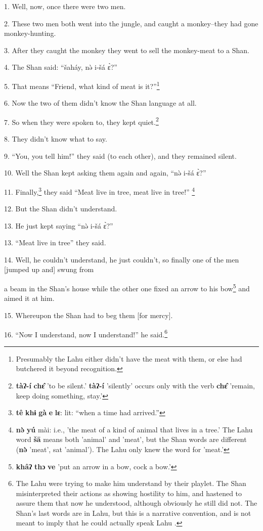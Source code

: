 \setcounter{footnote}{0}

1. Well, now, once there were two men.

2. These two men both went into the jungle, and caught a monkey--they had gone monkey-hunting.

3. After they caught the monkey they went to sell the monkey-meat to a Shan.

4. The Shan said: ``šaháy, nə̀ i-šá ɛ̀?''

5. That means ``Friend, what kind of meat is it?''\footnote{Presumably the Lahu either didn't have the meat with them, or else had butchered it beyond recognition.}

6. Now the two of them didn't know the Shan language at all.

7. So when they were spoken to, they kept quiet.\footnote{\textbf{tàʔ-í} \textbf{chɛ̂} 'to be silent.' \textbf{tàʔ-í} 'silently' occurs only with the verb \textbf{chɛ̂} 'remain, keep doing something, stay.'}

8. They didn't know what to say.

9. ``You, you tell him!'' they said (to each other), and they remained
silent.

10. Well the Shan kept asking them again and again, ``nə̀ i-šá ɛ̀?''

11. Finally,\footnote{\textbf{tê} \textbf{khɨ} \textbf{gà} \textbf{e} \textbf{lɛ}: lit: ``when a time had arrived.''} they said ``Meat live in tree, meat live in tree!''
\footnote{\textbf{nə̀} \textbf{yú} mài: i.e., 'the meat of a kind of animal that lives in a tree.' The Lahu word \textbf{šā} means both 'animal' and 'meat', but the Shan words are different (\textbf{nə̀} 'meat', sat 'animal'). The Lahu only knew the word for 'meat.'}

12. But the Shan didn't understand.

13. He just kept saying ``nə̀ i-šá ɛ̀?''

13. ``Meat live in tree'' they said.

14. Well, he couldn't understand, he just couldn't, so finally one of the men [jumped
up and] swung from

a beam in the Shan's house while the other one fixed an arrow to his bow\footnote{\textbf{khâʔ} \textbf{thɔ} \textbf{ve} 'put an arrow in a bow, cock a bow.'} and
aimed it at him.

15. Whereupon the Shan had to beg them [for mercy].

16. ``Now I understand, now I understand!'' he said.\footnote{The Lahu were trying to make him understand by their playlet. The Shan misinterpreted their actions as showing hostility to him, and hastened to assure them that now he understood, although obviously he still did not. The Shan's last words are in Lahu, but this is a narrative convention, and is not meant to imply that he could actually speak Lahu .}

